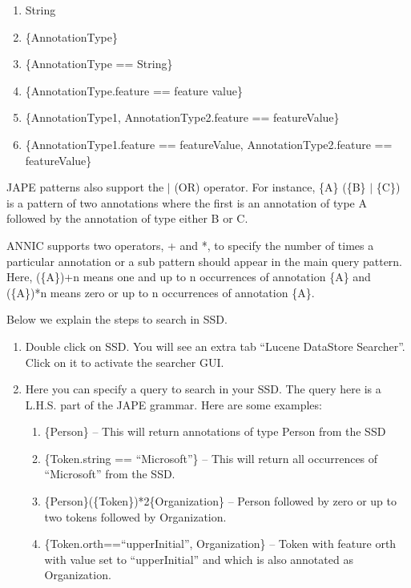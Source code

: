 \begin{enumerate}
\item String
\item \{AnnotationType\}
\item \{AnnotationType == String\}
\item \{AnnotationType.feature == feature value\}
\item \{AnnotationType1, AnnotationType2.feature == featureValue\}
\item \{AnnotationType1.feature == featureValue, AnnotationType2.feature == featureValue\}
\end{enumerate}

JAPE patterns also support the $|$ (OR) operator. For instance, \{A\} (\{B\} $|$
\{C\}) is a pattern of two annotations where the first is an annotation of type A
followed by the annotation of type either B or C.

ANNIC supports two operators,
+ and *, to specify the number of times a particular annotation or a sub pattern
should appear in the main query pattern. Here, (\{A\})+n means one and up to n
occurrences of annotation \{A\} and (\{A\})*n means zero or up to n occurrences of
annotation \{A\}.

Below we explain the steps to search in SSD.

\begin{enumerate}
\item Double click on SSD. You will see an extra tab ``Lucene DataStore
Searcher''. Click on it to activate the searcher GUI.
\item Here you can specify a query to search in your SSD. The query here is a
L.H.S. part of the JAPE grammar. Here are some examples:

\begin{enumerate}
\item \{Person\}  -- This will return annotations of type Person from the SSD
\item \{Token.string == ``Microsoft''\}  -- This will return all occurrences of
``Microsoft'' from the SSD.
\item \{Person\}(\{Token\})*2\{Organization\} -- Person followed by zero or
up to two
tokens followed by Organization.
\item \{Token.orth==``upperInitial'',  Organization\} -- Token with feature orth
with value set to ``upperInitial'' and which is also annotated as Organization.
\end{enumerate}
\end{enumerate}

